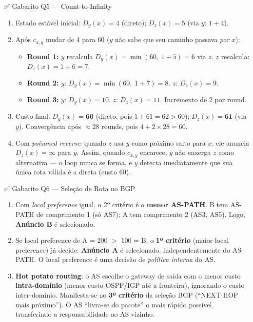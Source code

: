 \documentclass[11pt,a4paper]{article}
\begin{document}
\begin{gabaritocaixa}{✅ Gabarito Q5 --- Count-to-Infinity}
\begin{enumerate}[label=(\alph*)]
    \item Estado estável inicial: $D_y(x) = 4$ (direto); $D_z(x) = 5$ (via $y$: $1+4$).
    \item Após $c_{x,y}$ mudar de 4 para 60 ($y$ não sabe que seu caminho passava \emph{por} $x$):
    \begin{itemize}
        \item \textbf{Round 1:} $y$ recalcula $D_y(x) = \min(60,\; 1+5) = 6$ via $z$. $z$ recalcula: $D_z(x) = 1+6 = 7$.
        \item \textbf{Round 2:} $y$: $D_y(x) = \min(60,\; 1+7) = 8$. $z$: $D_z(x)=9$.
        \item \textbf{Round 3:} $y$: $D_y(x) = 10$. $z$: $D_z(x)=11$. Incremento de 2 por round.
    \end{itemize}
    \item Custo final: $D_y(x) = \mathbf{60}$ (direto, pois $1+61=62>60$); $D_z(x) = \mathbf{61}$ (via $y$). Convergência após $\approx 28$ rounds, pois $4 + 2 \times 28 = 60$.
    \item Com \textit{poisoned reverse}: quando $z$ usa $y$ como próximo salto para $x$, ele anuncia $D_z(x) = \infty$ para $y$. Assim, quando $c_{x,y}$ encarece, $y$ não enxerga $z$ como alternativa --- o loop nunca se forma, e $y$ detecta imediatamente que sua única rota válida é a direta (custo 60).
\end{enumerate}
\end{gabaritocaixa}

\begin{gabaritocaixa}{✅ Gabarito Q6 --- Seleção de Rota no BGP}
\begin{enumerate}[label=(\alph*)]
    \item Com \textit{local preference} igual, o 2º critério é o \textbf{menor AS-PATH}. B tem AS-PATH de comprimento 1 (só AS7); A tem comprimento 2 (AS3, AS5). Logo, \textbf{Anúncio B} é selecionado.
    \item Se local preference de A = 200 $>$ 100 = B, o \textbf{1º critério} (maior local preference) já decide: \textbf{Anúncio A} é selecionado, independentemente do AS-PATH. O local preference é uma decisão de \emph{política interna} do AS.
    \item \textbf{Hot potato routing}: o AS escolhe o gateway de saída com o menor custo \textbf{intra-domínio} (menor custo OSPF/IGP até a fronteira), ignorando o custo inter-domínio. Manifesta-se no \textbf{3º critério} da seleção BGP (``NEXT-HOP mais próximo''). O AS ``livra-se do pacote'' o mais rápido possível, transferindo a responsabilidade ao AS vizinho.
\end{enumerate}
\end{gabaritocaixa}
\end{document}

